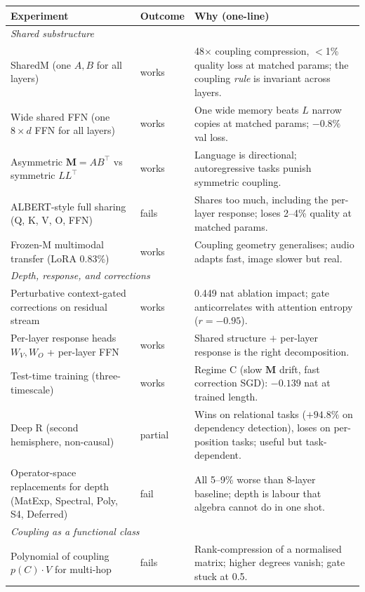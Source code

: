 \documentclass[11pt, a4paper]{article}
\newcommand{\M}{\mathbf{M}}
\newcommand{\rwin}{\cellcolor{rowgreen}}
\newcommand{\rloss}{\cellcolor{rowred}}
\newcommand{\rmixed}{\cellcolor{rowamber}}
\begin{document}
\begin{small}
\begin{longtable}{p{4.2cm} p{1.5cm} p{8.6cm}}
\toprule
\textbf{Experiment} & \textbf{Outcome} & \textbf{Why (one-line)} \\
\midrule
\endhead
\multicolumn{3}{l}{\textit{Shared substructure}} \\
\midrule
\rwin SharedM (one $A,B$ for all layers) & works & 48$\times$ coupling compression, $<$1\% quality loss at matched params; the coupling \emph{rule} is invariant across layers. \\
\rwin Wide shared FFN (one $8\times d$ FFN for all layers) & works & One wide memory beats $L$ narrow copies at matched params; $-0.8\%$ val loss. \\
\rwin Asymmetric $\M = AB^\top$ vs symmetric $LL^\top$ & works & Language is directional; autoregressive tasks punish symmetric coupling. \\
\rloss ALBERT-style full sharing (Q, K, V, O, FFN) & fails & Shares too much, including the per-layer response; loses 2--4\% quality at matched params. \\
\rwin Frozen-M multimodal transfer (LoRA 0.83\%) & works & Coupling geometry generalises; audio adapts fast, image slower but real. \\
\midrule
\multicolumn{3}{l}{\textit{Depth, response, and corrections}} \\
\midrule
\rwin Perturbative context-gated corrections on residual stream & works & 0.449 nat ablation impact; gate anticorrelates with attention entropy ($r=-0.95$). \\
\rwin Per-layer response heads $W_V, W_O$ + per-layer FFN & works & Shared structure $+$ per-layer response is the right decomposition. \\
\rwin Test-time training (three-timescale) & works & Regime C (slow $\M$ drift, fast correction SGD): $-0.139$ nat at trained length. \\
\rmixed Deep R (second hemisphere, non-causal) & partial & Wins on relational tasks ($+94.8\%$ on dependency detection), loses on per-position tasks; useful but task-dependent. \\
\rloss Operator-space replacements for depth (MatExp, Spectral, Poly, S4, Deferred) & fail & All 5--9\% worse than 8-layer baseline; depth is labour that algebra cannot do in one shot. \\
\midrule
\multicolumn{3}{l}{\textit{Coupling as a functional class}} \\
\midrule
\rloss Polynomial of coupling $p(C) \cdot V$ for multi-hop & fails & Rank-compression of a normalised matrix; higher degrees vanish; gate stuck at 0.5. \\

\end{longtable}
\end{small}
\end{document}
